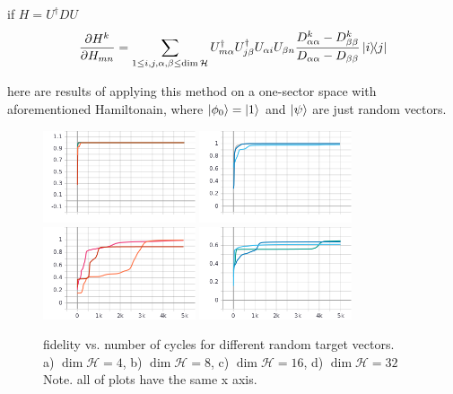 \documentclass{article}
\begin{document}
\begin{lemma}
if
$H = U^\dagger D U$
\[ \pdv{H^k}{H_{mn}} = \sum_{1 \le i, j, \alpha,\beta \le \dim{\mathcal{H}}} U_{m\alpha}^\dagger U_{j\beta}^\dagger U_{\alpha i} U_{\beta n} \frac{D_{\alpha\alpha}^k - D_{\beta\beta}^k}{D_{\alpha\alpha} - D_{\beta\beta}} \dyad{i}{j} \] 
\end{lemma}

here are results of applying this method on a one-sector space with aforementioned Hamiltonain, where $\ket{\phi_0} = \ket{1}$ and $\ket{\psi}$ are just random vectors.

\begin{figure}[H]
\centering
\includegraphics[width=0.4\textwidth]{fidelity_4}
\includegraphics[width=0.4\textwidth]{fidelity_8} \\
\includegraphics[width=0.4\textwidth]{fidelity_16}
\includegraphics[width=0.4\textwidth]{fidelity_32}
\caption{fidelity vs. number of cycles for different random target vectors. 
\\ a) $\dim \mathcal{H} = 4$, b) $\dim \mathcal{H} = 8$, c) $\dim \mathcal{H} = 16$, d) $\dim \mathcal{H} = 32$
\\ Note. all of plots have the same x axis.}
\end{figure}
\end{document}
